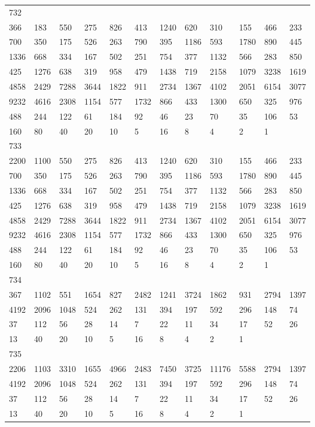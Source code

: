 \begin{longtable}{llllllllllll}
732&&&&&&&&&&&\\
366& 183& 550& 275& 826& 413& 1240& 620& 310& 155& 466& 233\\
700& 350& 175& 526& 263& 790& 395& 1186& 593& 1780& 890& 445\\
1336& 668& 334& 167& 502& 251& 754& 377& 1132& 566& 283& 850\\
425& 1276& 638& 319& 958& 479& 1438& 719& 2158& 1079& 3238& 1619\\
4858& 2429& 7288& 3644& 1822& 911& 2734& 1367& 4102& 2051& 6154& 3077\\
9232& 4616& 2308& 1154& 577& 1732& 866& 433& 1300& 650& 325& 976\\
488& 244& 122& 61& 184& 92& 46& 23& 70& 35& 106& 53\\
160& 80& 40& 20& 10& 5& 16& 8& 4& 2& 1& \\

733&&&&&&&&&&&\\
2200& 1100& 550& 275& 826& 413& 1240& 620& 310& 155& 466& 233\\
700& 350& 175& 526& 263& 790& 395& 1186& 593& 1780& 890& 445\\
1336& 668& 334& 167& 502& 251& 754& 377& 1132& 566& 283& 850\\
425& 1276& 638& 319& 958& 479& 1438& 719& 2158& 1079& 3238& 1619\\
4858& 2429& 7288& 3644& 1822& 911& 2734& 1367& 4102& 2051& 6154& 3077\\
9232& 4616& 2308& 1154& 577& 1732& 866& 433& 1300& 650& 325& 976\\
488& 244& 122& 61& 184& 92& 46& 23& 70& 35& 106& 53\\
160& 80& 40& 20& 10& 5& 16& 8& 4& 2& 1& \\

734&&&&&&&&&&&\\
367& 1102& 551& 1654& 827& 2482& 1241& 3724& 1862& 931& 2794& 1397\\
4192& 2096& 1048& 524& 262& 131& 394& 197& 592& 296& 148& 74\\
37& 112& 56& 28& 14& 7& 22& 11& 34& 17& 52& 26\\
13& 40& 20& 10& 5& 16& 8& 4& 2& 1& \\

735&&&&&&&&&&&\\
2206& 1103& 3310& 1655& 4966& 2483& 7450& 3725& 11176& 5588& 2794& 1397\\
4192& 2096& 1048& 524& 262& 131& 394& 197& 592& 296& 148& 74\\
37& 112& 56& 28& 14& 7& 22& 11& 34& 17& 52& 26\\
13& 40& 20& 10& 5& 16& 8& 4& 2& 1& \\


\end{longtable}
